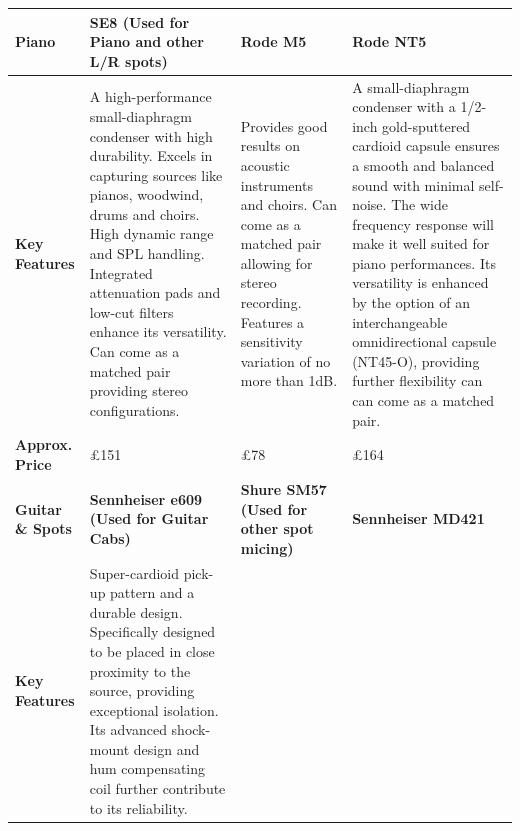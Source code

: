                 \begin{longtable}[H]{|p{1.5cm}|p{4.8cm}|p{4.8cm}|p{4.8cm}|}
                    \hline
                    \textbf{Piano} &
                      \cellcolor[HTML]{9AFF99}\textbf{SE8 (Used for Piano and other L/R spots)} &
                      \cellcolor[HTML]{FFCCC9}\textbf{Rode M5} &
                      \cellcolor[HTML]{FFCCC9}\textbf{Rode NT5} \\ \hline
                    \endfirsthead
                    \endhead
                    \textbf{Key Features} &
                      \cellcolor[HTML]{9AFF99}A high-performance small-diaphragm condenser with high durability. Excels in capturing sources like pianos, woodwind, drums and choirs. High dynamic range and SPL handling. Integrated attenuation pads and low-cut filters enhance its versatility. Can come as a matched pair providing stereo configurations. \citep{se8} &
                      \cellcolor[HTML]{FFCCC9}Provides good results on acoustic instruments and choirs. Can come as a matched pair allowing for stereo recording. Features a sensitivity variation of no more than 1dB. \citep{rodem5} &
                      \cellcolor[HTML]{FFCCC9}A small-diaphragm condenser with a 1/2-inch gold-sputtered cardioid capsule ensures a smooth and balanced sound with minimal self-noise. The wide frequency response will make it well suited for piano performances. Its versatility is enhanced by the option of an interchangeable omnidirectional capsule (NT45-O), providing further flexibility can can come as a matched pair. \citep{rodent5} \\ \hline
                    \textbf{Approx. Price} &
                      £151 &
                      £78 &
                      £164 \\ \hline
                    \textbf{Guitar \& Spots} &
                      \cellcolor[HTML]{9AFF99}\textbf{Sennheiser e609 (Used for Guitar Cabs)} &
                      \cellcolor[HTML]{9AFF99}\textbf{Shure SM57 (Used for other spot micing)} &
                      \cellcolor[HTML]{FFCCC9}\textbf{Sennheiser MD421} \\ \hline
                    \textbf{Key Features} &
                      \cellcolor[HTML]{9AFF99}Super-cardioid pick-up pattern and a durable design. Specifically designed to be placed in close proximity to the source, providing exceptional isolation. Its advanced shock-mount design and hum compensating coil further contribute to its reliability. \citep{sennheisere609} &

\end{longtable}
